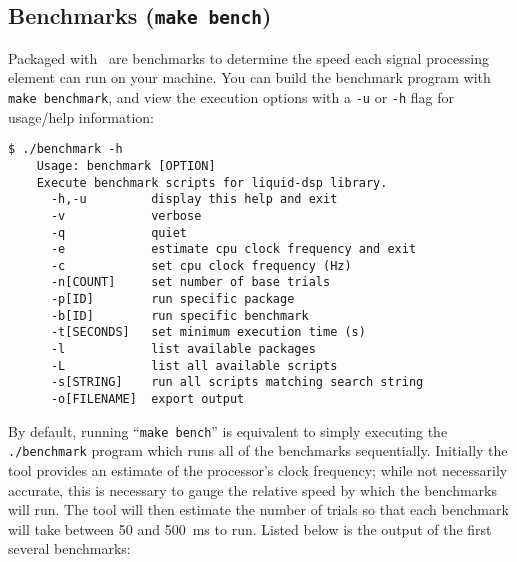 \subsection{Benchmarks ({\tt make bench})}
\label{section:installation:targets:benchmarks}
Packaged with \liquid\ are benchmarks to determine the speed each signal
processing element can run on your machine.
You can build the benchmark program with {\tt make benchmark}, and view
the execution options with a {\tt -u} or {\tt -h} flag for usage/help
information:
%
\begin{Verbatim}[fontsize=\small]
    $ ./benchmark -h
    Usage: benchmark [OPTION]
    Execute benchmark scripts for liquid-dsp library.
      -h,-u         display this help and exit
      -v            verbose
      -q            quiet
      -e            estimate cpu clock frequency and exit
      -c            set cpu clock frequency (Hz)
      -n[COUNT]     set number of base trials
      -p[ID]        run specific package
      -b[ID]        run specific benchmark
      -t[SECONDS]   set minimum execution time (s)
      -l            list available packages
      -L            list all available scripts
      -s[STRING]    run all scripts matching search string
      -o[FILENAME]  export output
\end{Verbatim}
%
By default, running ``{\tt make bench}'' is equivalent to simply
executing the {\tt ./benchmark} program which runs all of the benchmarks
sequentially.
Initially the tool provides an estimate of the processor's clock
frequency;
while not necessarily accurate, this is necessary to gauge the relative
speed by which the benchmarks will run.
The tool will then estimate the number of trials so that each benchmark
will take between 50 and 500~ms to run.
Listed below is the output of the first several benchmarks:
%
